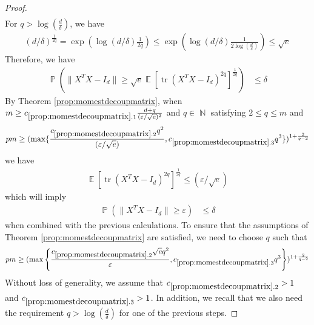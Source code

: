 \documentclass[11pt]{amsart}
\numberwithin{equation}{section}
\numberwithin{equation}{section}
\DeclareMathOperator{\E}{\mathbb{E}}
\DeclareMathOperator{\N}{\mathbb{N}}
\DeclareMathOperator{\Pb}{\mathbb{P}}
\DeclareMathOperator*{\tr}{tr}
\theoremstyle{remark}
\theoremstyle{definition}
\begin{document}
\begin{proof}
\begin{align*}
    \end{align*}    
For $q> \log (\frac{d}{\delta}) $, we have
\begin{align*}
    (d/\delta)^{\frac{1}{2q}}=\exp(\log(d/\delta)\frac{1}{2q}) \le \exp(\log(d/\delta)\frac{1}{2\log (\frac{d}{\delta})}) \le {\sqrt{e}}
\end{align*}
Therefore, we have
\begin{align*}
        \Pb \left( \| X^TX - I_d \| \ge \sqrt{e} \E [ \tr (X^TX - I_d)^{2q}]^\frac{1}{2q} \right) &\le \delta
    \end{align*}
By Theorem \ref{prop:momestdecoupmatrix}, when
$m \geq c_{\ref*{prop:momestdecoupmatrix}.1} \frac{d+q}{(\varepsilon/\sqrt{e})^2}$ and $q \in \N$ satisfying $2 \le q \le m$ and \begin{align*}pm \ge (\max\{\frac{c_{\ref*{prop:momestdecoupmatrix}.2} q^{2}}{(\varepsilon/\sqrt{e})}, c_{\ref*{prop:momestdecoupmatrix}.3} q^3\})^{1+\frac{2}{q-2}} \end{align*} we have
\begin{align*}
    \E[\tr(X^TX - I_d)^{2q}]^\frac{1}{2q} \leq  (\varepsilon/\sqrt{e})
\end{align*}
which will imply
\begin{align*}
        \Pb \left( \| X^TX - I_d \| \ge \varepsilon \right) &\le \delta
    \end{align*}
when combined with the previous calculations.
    To ensure that the assumptions of Theorem \ref{prop:momestdecoupmatrix} are satisfied, we need to choose $q$ such that
    \begin{align*}pm \ge (\max \left\{ \frac{c_{\ref*{prop:momestdecoupmatrix}.2}\sqrt{e} q^2}{ \varepsilon}, c_{\ref*{prop:momestdecoupmatrix}.3} q^3 \right\})^{1+\frac{2}{q-2}} \end{align*}
Without loss of generality, we assume that $c_{\ref*{prop:momestdecoupmatrix}.2}>1$ and $c_{\ref*{prop:momestdecoupmatrix}.3}>1$.
In addition, we recall that we also need the requirement $q> \log (\frac{d}{\delta}) $ for one of the previous steps.



\end{proof}
\end{document}
